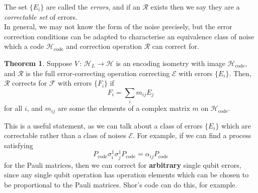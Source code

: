 \documentclass[12pt,a4paper]{report}
\numberwithin{equation}{section}
\newcommand{\Pc}{P_{\text{code}}}
\newcommand{\Hcode}{\mathcal{H}_{\text{code}}}
\theoremstyle{definition}
\theoremstyle{theorem}
\newtheorem{theorem}{Theorem}[section]
\theoremstyle{theorem}
\theoremstyle{example}
\theoremstyle{definition}
\begin{document}
The set $\{E_{i}\}$ are called the \textit{errors}, and if an $\mathcal{R}$ exists then we say they are a \textit{correctable set} of errors.\\
In general, we may not know the form of the noise precisely, but the error correction conditions can be adapted to characterise an equivalence class of noise which a code $\Hcode$ and correction operation $\mathcal{R}$ can correct for.
\begin{theorem}
	Suppose $V\,:\,\mathcal{H}_{L}\to\mathcal{H}$ is an encoding isometry with image $\Hcode$, and $\mathcal{R}$ is the full error-correcting operation correcting $\mathcal{E}$ with errors $\{E_{i}\}$. Then, $\mathcal{R}$ corrects for $\mathcal{F}$ with errors $\{F_{i}\}$ if
	\begin{equation}
		F_{i}=\sum_{i}m_{ij}E_{j}
	\end{equation}
	for all $i$, and $m_{ij}$ are some the elements of a complex matrix $m$ on $\Hcode$.
\end{theorem}
This is a useful statement, as we can talk about a class of errors $\{E_{i}\}$ which are correctable rather than a class of noises $\mathcal{E}$. For example, if we can find a process satisfying
\begin{equation}
	\Pc \sigma_{i}^{1}\sigma_{j}^{1}\Pc=\alpha_{ij}\Pc
\end{equation}
for the Pauli matrices, then we can correct for \textbf{arbitrary} single qubit errors, since any single qubit operation has operation elements which can be chosen to be proportional to the Pauli matrices. Shor's code \cite{PhysRevA.52.R2493} can do this, for example.
\end{document}
